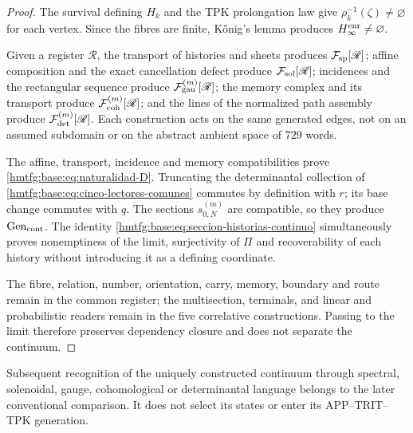 \begin{proof}
The survival defining \(H_k\) and the TPK prolongation law give
\(\rho_k^{-1}(\zeta)\neq\varnothing\) for each vertex. Since the fibres are
finite, Kőnig’s lemma produces \(H_\infty^{\rm enr}\neq\varnothing\).

Given a register \(\mathscr R\), the transport of histories and sheets produces
\(\mathcal F_{\rm sp}[\mathscr R]\); affine composition and the exact cancellation
defect produce \(\mathcal F_{\rm sol}[\mathscr R]\); incidences
and the rectangular sequence produce \(\mathcal F_{\rm gau}^{(m)}[\mathscr R]\);
the memory complex and its transport produce
\(\mathcal F_{\rm coh}^{(m)}[\mathscr R]\); and the lines of the normalized
path assembly produce \(\mathcal F_{\rm det}^{(m)}[\mathscr R]\).
Each construction acts on the same generated edges, not on an
assumed subdomain or on the abstract ambient space of \(729\) words.

The affine, transport, incidence and memory compatibilities prove \eqref{hmtfg:base:eq:naturalidad-D}. Truncating the determinantal collection of \eqref{hmtfg:base:eq:cinco-lectores-comunes} commutes by definition with \(r\); its base change commutes with \(q\). The sections \(s_{0,N}^{(m)}\) are compatible, so they produce \(\operatorname{Gen}_{\rm cont}\). The identity \eqref{hmtfg:base:eq:seccion-historias-continuo} simultaneously proves nonemptiness of the limit, surjectivity of \(\Pi\) and recoverability of each history without introducing it as a defining coordinate.

The fibre, relation, number, orientation, carry, memory,
boundary and route remain in the common register; the multisection,
terminals, and linear and probabilistic readers remain in the five
correlative constructions. Passing to the limit therefore preserves dependency
closure and does not separate the continuum.
\end{proof}

Subsequent recognition of the uniquely constructed continuum through spectral,
solenoidal, gauge, cohomological or determinantal language belongs to the
later conventional comparison. It does not select its states or enter
its APP--TRIT--TPK generation.
